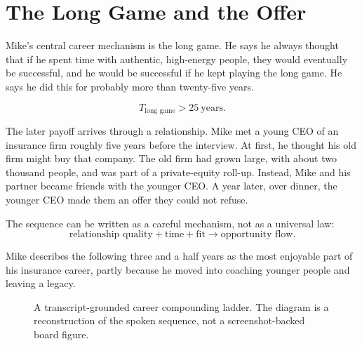 \section{The Long Game and the Offer}

Mike's central career mechanism is the long game. He says he always thought that if he spent time with authentic, high-energy people, they would eventually be successful, and he would be successful if he kept playing the long game. He says he did this for probably more than twenty-five years.

\begin{equation}
T_{\text{long game}} > 25 \ \text{years}.
\end{equation}

The later payoff arrives through a relationship. Mike met a young CEO of an insurance firm roughly five years before the interview. At first, he thought his old firm might buy that company. The old firm had grown large, with about two thousand people, and was part of a private-equity roll-up. Instead, Mike and his partner became friends with the younger CEO. A year later, over dinner, the younger CEO made them an offer they could not refuse.

The sequence can be written as a careful mechanism, not as a universal law:
\begin{equation}
\text{relationship quality} + \text{time} + \text{fit}
\longrightarrow
\text{opportunity flow}.
\end{equation}

Mike describes the following three and a half years as the most enjoyable part of his insurance career, partly because he moved into coaching younger people and leaving a legacy.

\begin{figure}
\centering
{}
\caption{A transcript-grounded career compounding ladder. The diagram is a reconstruction of the spoken sequence, not a screenshot-backed board figure.}
\end{figure}

